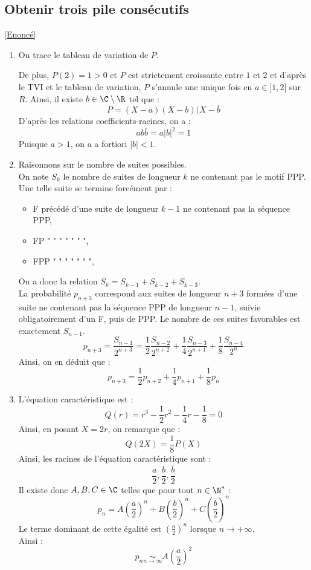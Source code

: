 \documentclass[8pt]{book}
\begin{document}
	\subsection{Obtenir trois pile consécutifs}
	\label{Obtenir trois pile consécutifs corrigé}
	\textcolor{blue}{\hyperref[Obtenir trois pile consécutifs]{[Enoncé]}}\\
	\begin{enumerate}
		\item On trace le tableau de variation de $P$.\\
		\begin{center}\end{center}
		De plus, $P(2)=1>0$ et $P$ est strictement croissante entre $1$ et $2$ et d'après le TVI et le tableau de variation, $P$ s'annule une unique fois en $a\in]1,2[$ sur $R$.
		Ainsi, il existe $b\in \C\setminus \R$ tel que :
		\[P=(X-a)(X-b)(X-\overline{b}\]
		D'après les relations coefficients-racines, on a :
		\[ab\overline{b}=a|b|^2=1\]
		Puisque $a>1$, on a a fortiori $|b|<1$.\\
		\item Raisonnons sur le nombre de suites possibles.\\
		On note $S_k$ le nombre de suites de longueur $k$ ne contenant pas le motif PPP. Une telle suite se termine forcément par :
		\begin{itemize}
			\item F précédé d'une suite de longueur $k-1$ ne contenant pas la séquence PPP,
			\item FP " " " " " " ",
			\item FPP " " " " " " ",
		\end{itemize}
		On a donc la relation $S_{k}=S_{k-1}+S_{k-2}+S_{k-3}$.\\
		La probabilité $p_{n+3}$ correspond aux suites de longueur $n+3$ formées d'une suite ne contenant pas la séquence PPP de longueur $n-1$, suivie obligatoirement d'un F, puis de PPP. Le nombre de ces suites favorables est exactement $S_{n-1}$.\\
		\[p_{n+3}=\frac{S_{n-1}}{2^{n+3}}=\frac{1}{2}\frac{S_{n-2}}{2^{n+2}}+\frac{1}{4}\frac{S_{n-3}}{2^{n+1}}+\frac{1}{8}\frac{S_{n-4}}{2^{n}}\]
		Ainsi, on en déduit que :
		\[p_{n+3}=\frac{1}{2}p_{n+2}+\frac{1}{4}p_{n+1}+\frac{1}{8}p_{n}\]
		\item L'équation caractéristique est :
		\[Q(r)=r^3-\frac{1}{2}r^2-\frac{1}{4}r-\frac{1}{8}=0\]
		Ainsi, en posant $X=2r$, on remarque que :
		\[Q(2X)=\frac{1}{8}P(X)\]
		Ainsi, les racines de l'équation caractéristique sont :
		\[\frac{a}{2},\frac{b}{2},\frac{\overline{b}}{2}\]
		Il existe donc $A,B,C\in\C$ telles que pour tout $n\in\N^*$ :
		\[p_n=A\left(\frac{a}{2}\right)^n+B\left(\frac{b}{2}\right)^n+C\left(\frac{\overline{b}}{2}\right)^n\]
		Le terme dominant de cette égalité est $\left(\frac{a}{2}\right)^n$ lorsque $n\to+\infty$.\\
		Ainsi :
		\[p_n\underset{n\to\infty}{\sim}A\left(\frac{a}{2}\right)^2\]
		\end{enumerate}
\end{document}
